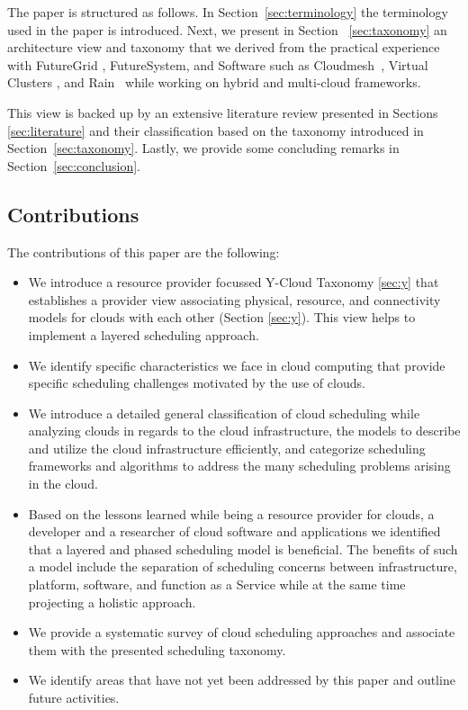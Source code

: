 \documentclass[final,5p,times,twocolumn]{elsarticle}
\begin{document}
The paper is structured as follows. In Section~\ref{sec:terminology} the terminology used in the paper is introduced. Next, we present in Section ~\ref{sec:taxonomy} an architecture view and taxonomy that we derived from the practical experience with FutureGrid \cite{las12fg-bookchapter}, FutureSystem, and Software such as Cloudmesh~\cite{von2014accessing}, Virtual Clusters \cite{las-comet}, and Rain~\cite{las-fg-1295,las10dynamic,las-rain} while working on hybrid and multi-cloud frameworks.

This view is backed up by an extensive literature review presented in Sections \ref{sec:literature} and their classification based on the taxonomy introduced in Section~\ref{sec:taxonomy}. Lastly, we provide some concluding remarks in Section~\ref{sec:conclusion}.


\subsection{Contributions}

The contributions of this paper are the following:

\begin{itemize}
 
\item We introduce a resource provider focussed Y-Cloud Taxonomy \ref{sec:y} that establishes a provider view associating physical, resource, and connectivity models for clouds with each other (Section \ref{sec:y}). This view helps to implement a layered scheduling approach.

\item We identify specific characteristics we face in cloud computing that provide specific scheduling challenges motivated by the use of clouds.

\item We introduce a detailed general classification of cloud scheduling while analyzing clouds in regards to the cloud infrastructure, the models to describe and utilize the cloud infrastructure efficiently, and categorize scheduling frameworks and algorithms to address the many scheduling problems arising in the cloud.

\item Based on the lessons learned while being a resource provider for clouds, a developer and a researcher of cloud software and applications we identified that a layered and phased scheduling model is beneficial. The benefits of such a model include the separation of scheduling concerns between infrastructure, platform, software, and function as a Service while at the same time projecting a holistic approach.

\item We provide a systematic survey of cloud scheduling approaches and associate them with the presented scheduling taxonomy.

\item We identify areas that have not yet been addressed by this paper and outline future activities.
\end{itemize}
\end{document}
